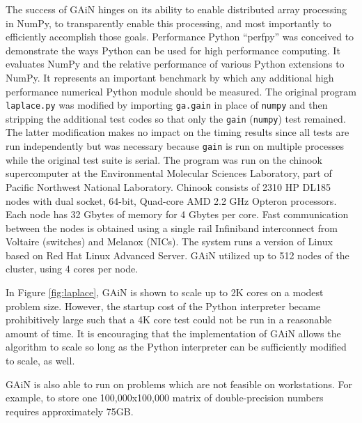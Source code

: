 \documentclass{sigplanconf}
\begin{document}
The success of GAiN hinges on its ability to enable distributed array
processing in NumPy, to transparently enable this processing, and most
importantly to efficiently accomplish those goals. Performance Python
\cite{Ram08} “perfpy” was conceived to demonstrate the ways Python can be used
for high performance computing. It evaluates NumPy and the relative
performance of various Python extensions to NumPy. It represents an important
benchmark by which any additional high performance numerical Python module
should be measured. The original program \verb=laplace.py= was modified by
importing \verb=ga.gain= in place of \verb=numpy= and then stripping the
additional test codes so that only the \verb=gain= (\verb=numpy=) test
remained. The latter modification makes no impact on the timing results since
all tests are run independently but was necessary because \verb=gain= is run
on multiple processes while the original test suite is serial.  The program
was run on the chinook supercomputer at the Environmental Molecular Sciences
Laboratory, part of Pacific Northwest National Laboratory.  Chinook consists
of 2310 HP DL185 nodes with dual socket, 64-bit, Quad-core AMD 2.2 GHz Opteron
processors. Each node has 32 Gbytes of memory for 4 Gbytes per core. Fast
communication between the nodes is obtained using a single rail Infiniband
interconnect from Voltaire (switches) and Melanox (NICs). The system runs a
version of Linux based on Red Hat Linux Advanced Server.  GAiN utilized up to
512 nodes of the cluster, using 4 cores per node.

In Figure \ref{fig:laplace}, GAiN is shown to scale up to 2K cores on a modest
problem size. However, the startup cost of the Python interpreter became
prohibitively large such that a 4K core test could not be run in a reasonable
amount of time. It is encouraging that the implementation of GAiN allows the
algorithm to scale so long as the Python interpreter can be sufficiently
modified to scale, as well.

GAiN is also able to run on problems which are not feasible on workstations.
For example, to store one 100,000x100,000 matrix of double-precision numbers
requires approximately 75GB. 
\end{document}
